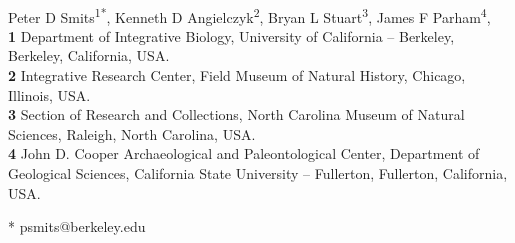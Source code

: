 \documentclass[10pt,letterpaper]{article}
\date{}
\begin{document}
\vspace*{0.2in}

\begin{flushleft}
  {\Large
  \textbf{} %
  }
  \newline
  \\
  Peter D Smits\textsuperscript{1*},
  Kenneth D Angielczyk\textsuperscript{2},
  Bryan L Stuart\textsuperscript{3},
  James F Parham\textsuperscript{4},
  \\
  \bigskip
  \textbf{1} Department of Integrative Biology, University of California -- Berkeley, Berkeley, California, USA.
  \\
  \textbf{2} Integrative Research Center, Field Museum of Natural History, Chicago, Illinois, USA.
  \\
  \textbf{3} Section of Research and Collections, North Carolina Museum of Natural Sciences, Raleigh, North Carolina, USA.
  \\
  \textbf{4} John D. Cooper Archaeological and Paleontological Center, Department of Geological Sciences, California State University -- Fullerton, Fullerton, California, USA.
  \\
  \bigskip






  * psmits@berkeley.edu

\end{flushleft}
\end{document}
